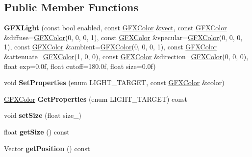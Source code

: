 \subsection*{Public Member Functions}
\begin{DoxyCompactItemize}
\item 
{\bfseries G\+F\+X\+Light} (const bool enabled, const \hyperlink{structGFXColor}{G\+F\+X\+Color} \&\hyperlink{classGFXLight_a334e846aa90e15b6bf371f6fed258134}{vect}, const \hyperlink{structGFXColor}{G\+F\+X\+Color} \&diffuse=\hyperlink{structGFXColor}{G\+F\+X\+Color}(0, 0, 0, 1), const \hyperlink{structGFXColor}{G\+F\+X\+Color} \&specular=\hyperlink{structGFXColor}{G\+F\+X\+Color}(0, 0, 0, 1), const \hyperlink{structGFXColor}{G\+F\+X\+Color} \&ambient=\hyperlink{structGFXColor}{G\+F\+X\+Color}(0, 0, 0, 1), const \hyperlink{structGFXColor}{G\+F\+X\+Color} \&attenuate=\hyperlink{structGFXColor}{G\+F\+X\+Color}(1, 0, 0), const \hyperlink{structGFXColor}{G\+F\+X\+Color} \&direction=\hyperlink{structGFXColor}{G\+F\+X\+Color}(0, 0, 0), float exp=0.\+0f, float cutoff=180.\+0f, float size=0.\+0f)\hypertarget{classGFXLight_a17a6184ecae3ab7af6f5c1059d172df7}{}\label{classGFXLight_a17a6184ecae3ab7af6f5c1059d172df7}

\item 
void {\bfseries Set\+Properties} (enum L\+I\+G\+H\+T\+\_\+\+T\+A\+R\+G\+ET, const \hyperlink{structGFXColor}{G\+F\+X\+Color} \&color)\hypertarget{classGFXLight_a684875e057cf732b2ce45b9f4359fb64}{}\label{classGFXLight_a684875e057cf732b2ce45b9f4359fb64}

\item 
\hyperlink{structGFXColor}{G\+F\+X\+Color} {\bfseries Get\+Properties} (enum L\+I\+G\+H\+T\+\_\+\+T\+A\+R\+G\+ET) const \hypertarget{classGFXLight_a64c35244526b9717db771824ec3c5fac}{}\label{classGFXLight_a64c35244526b9717db771824ec3c5fac}

\item 
void {\bfseries set\+Size} (float size\+\_\+)\hypertarget{classGFXLight_abd907fd75c0375cc851f1aaaad54f169}{}\label{classGFXLight_abd907fd75c0375cc851f1aaaad54f169}

\item 
float {\bfseries get\+Size} () const \hypertarget{classGFXLight_a2bf690c26ee9e5d2792054195bdc703e}{}\label{classGFXLight_a2bf690c26ee9e5d2792054195bdc703e}

\item 
Vector {\bfseries get\+Position} () const \hypertarget{classGFXLight_a0ad7ac117d42a5982eb30ef384e59dd9}{}\label{classGFXLight_a0ad7ac117d42a5982eb30ef384e59dd9}


\end{DoxyCompactItemize}
